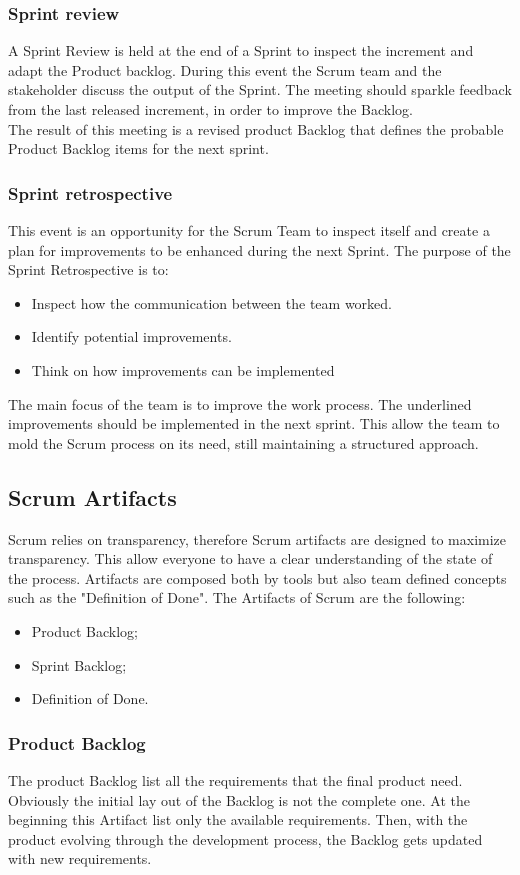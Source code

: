 \documentclass[../main.tex]{subfiles}
\begin{document}
\subsubsection{Sprint review}
A Sprint Review is held at the end of a Sprint to inspect the increment and adapt the Product backlog. During this event the Scrum team and the stakeholder discuss the output of the Sprint. The meeting should sparkle feedback from the last released increment, in order to improve the Backlog.\\
The result of this meeting is a revised product Backlog that defines the probable Product Backlog items for the next sprint.
\subsubsection{Sprint retrospective}
This event is an opportunity for the Scrum Team to inspect itself and create a plan for improvements to be enhanced during the next Sprint. The purpose of the Sprint Retrospective is to:
\begin{itemize}
    \item Inspect how the communication between the team worked.
    \item Identify potential improvements.
    \item Think on how improvements can be implemented
\end{itemize}
The main focus of the team is to improve the work process. The underlined improvements should be implemented in the next sprint. This allow the team to mold the Scrum process on its need, still maintaining a structured approach. 
\subsection{Scrum Artifacts}
Scrum relies on transparency, therefore Scrum artifacts are designed to maximize transparency. This allow everyone to have a clear understanding of the state of the process.
Artifacts are composed both by tools but also team defined concepts such as the "Definition of Done". The Artifacts of Scrum are the following:
\begin{itemize}
    \item Product Backlog;
    \item Sprint Backlog;
    \item Definition of Done. 
\end{itemize}
\subsubsection{Product Backlog}
The product Backlog list all the requirements that the final product need. Obviously the initial lay out of the Backlog is not the complete one. At the beginning this Artifact list only the available requirements. Then, with the product evolving through the development process, the Backlog gets updated with new requirements.\\
\end{document}
